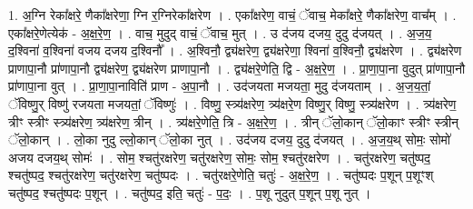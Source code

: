 \documentclass[17pt]{extarticle}
\begin{document}
1. अ॒ग्नि रेका᳚क्षरे॒ णैका᳚क्षरेणा॒ ग्नि र॒ग्निरेका᳚क्षरेण । . एका᳚क्षरेण॒ वाचं॒ ॅवाच॒ मेका᳚क्षरे॒ णैका᳚क्षरेण॒ वाच᳚म् । . एका᳚क्षरे॒णेत्येक॑ - अ॒क्ष॒रे॒ण॒ । . वाच॒ मुदुद् वाचं॒ ॅवाच॒ मुत् । . उ द॑जय दजय॒ दुदु द॑जयत् । . अ॒ज॒य॒ द॒श्विना॑ व॒श्विना॑ वजय दजय द॒श्विनौ᳚ । . अ॒श्विनौ॒ द्व्य॑क्षरेण॒ द्व्य॑क्षरेणा॒ श्विना॑ व॒श्विनौ॒ द्व्य॑क्षरेण । . द्व्य॑क्षरेण प्राणापा॒नौ प्रा॑णापा॒नौ द्व्य॑क्षरेण॒ द्व्य॑क्षरेण प्राणापा॒नौ । . द्व्य॑क्षरे॒णेति॒ द्वि - अ॒क्ष॒रे॒ण॒ । . प्रा॒णा॒पा॒ना वुदुत् प्रा॑णापा॒नौ प्रा॑णापा॒ना वुत् । . प्रा॒णा॒पा॒नाविति॑ प्राण - अ॒पा॒नौ । . उद॑जयता मजयता॒ मुदु द॑जयताम् । . अ॒ज॒य॒तां॒ ॅविष्णु॒र् विष्णु॑ रजयता मजयतां॒ ॅविष्णुः॑ । . विष्णु॒ स्त्र्य॑क्षरेण॒ त्र्य॑क्षरे॒ण विष्णु॒र् विष्णु॒ स्त्र्य॑क्षरेण । . त्र्य॑क्षरेण॒ त्रीꣳ स्त्रीꣳ स्त्र्य॑क्षरेण॒ त्र्य॑क्षरेण॒ त्रीन् । . त्र्य॑क्षरे॒णेति॒ त्रि - अ॒क्ष॒रे॒ण॒ । . त्रीन् ॅलो॒कान् ॅलो॒काꣳ स्त्रीꣳ स्त्रीन् ॅलो॒कान् । . लो॒का नुदु ल्लो॒कान् ॅलो॒का नुत् । . उद॑जय दजय॒ दुदु द॑जयत् । . अ॒ज॒य॒थ् सोमः॒ सोमो॑ अजय दजय॒थ् सोमः॑ । . सोम॒ श्चतु॑रक्षरेण॒ चतु॑रक्षरेण॒ सोमः॒ सोम॒ श्चतु॑रक्षरेण । . चतु॑रक्षरेण॒ चतु॑ष्पद॒ श्चतु॑ष्पद॒ श्चतु॑रक्षरेण॒ चतु॑रक्षरेण॒ चतु॑ष्पदः । . चतु॑रक्षरे॒णेति॒ चतुः॑ - अ॒क्ष॒रे॒ण॒ । . चतु॑ष्पदः प॒शून् प॒शूꣳश् चतु॑ष्पद॒ श्चतु॑ष्पदः प॒शून् । . चतु॑ष्पद॒ इति॒ चतुः॑ - प॒दः॒ । . प॒शू नुदुत् प॒शून् प॒शू नुत् । \newline
\end{document}
